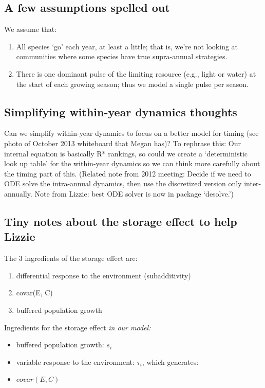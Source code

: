 \documentclass[11pt,a4paper,oneside]{article}
\begin{document}
\subsection{A few assumptions spelled out}
\noindent We assume that:
\begin{enumerate}
\item All species `go' each year, at least a little; that is, we're
  not looking at communities where some species have true
  supra-annual strategies.
\item There is one dominant pulse of the limiting resource (e.g.,
  light or water) at the
  start of each growing season; thus we model a  single pulse per
  season.
\end{enumerate}

\subsection{Simplifying within-year dynamics thoughts}
Can we simplify within-year dynamics to focus on a better model for timing (see photo of October 2013 whiteboard that Megan has)? To rephrase this: Our internal equation is basically R* rankings, so could we create a `deterministic look up table' for the within-year dynamics so we can think more carefully about the timing part of this.  (Related note from 2012 meeting: Decide if we need to ODE solve the intra-annual
  dynamics, then use the discretized version only inter-annually. Note from Lizzie: best ODE solver is now in package `desolve.')\\


\subsection{Tiny notes about the storage effect to help Lizzie}
\noindent The 3 ingredients of the storage effect are:
\begin{enumerate}
\item differential response to the environment (subadditivity)
\item covar(E, C)
\item buffered population growth
\end{enumerate}

\noindent Ingredients for the storage effect \emph{in our model:}
\begin{itemize}
\item buffered population growth: \(s_{i}\)
\item variable response to the environment: \(\tau_{i}\), which generates:
\item \(covar(E,C)\)
\end{itemize}
\end{document}
